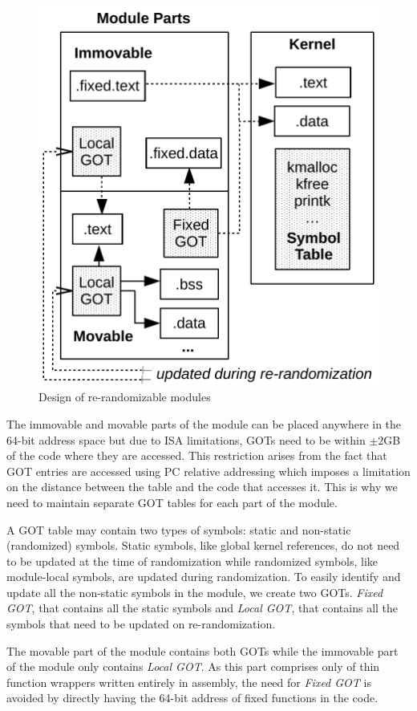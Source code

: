 \begin{figure}[ht!]
\centering
\includegraphics[width=.6\columnwidth]{pictures/design.pdf}
\caption{Design of re-randomizable modules~\cite{Adelie}}
\label{fig:design}
\end{figure}

The immovable and movable parts of the module can be placed anywhere in the 64-bit address space but due to ISA limitations, GOTs need to be within $\pm 2$GB of the code where they are accessed. This restriction arises from the fact that GOT entries are accessed using PC relative addressing which imposes a limitation on the distance between the table and the code that accesses it. This is why we need to maintain separate GOT tables for each part of the module.

A GOT table may contain two types of symbols: static and non-static (randomized) symbols. Static symbols, like global kernel references, do not need to be updated at the time of randomization while randomized symbols, like module-local symbols, are updated during randomization. To easily identify and update all the non-static symbols in the module, we create two GOTs. \textit{Fixed GOT}, that contains all the static symbols and \textit{Local GOT}, that contains all the symbols that need to be updated on re-randomization.

The movable part of the module contains both GOTs while the immovable part of the module only contains \textit{Local GOT}. As this part comprises only of thin function wrappers written entirely in assembly, the need for \textit{Fixed GOT} is avoided by directly having the 64-bit address of fixed functions in the code.

